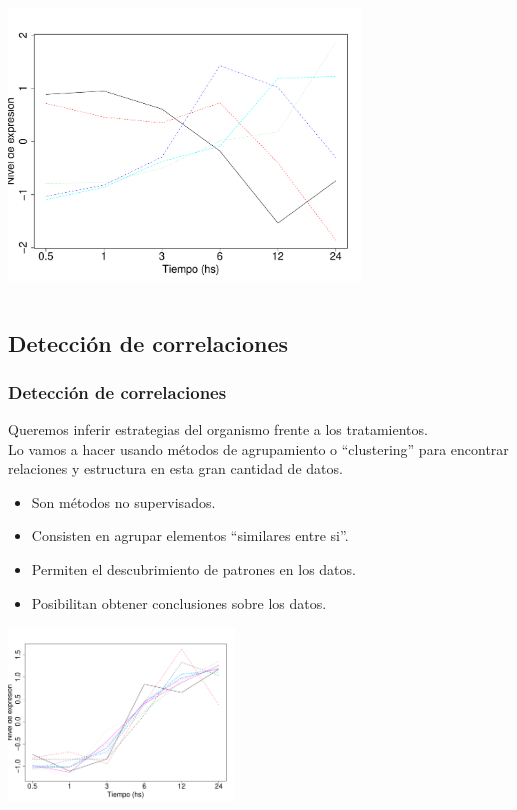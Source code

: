 \documentclass[serif,9pt, t]{beamer}
\begin{document}
\begin{frame}
\begin{columns}[T]
			\centering	
			\includegraphics[width=0.7\textwidth]{perfiles_sin_agrupar.pdf}			
	\end{columns}
\end{frame}

\subsection{Detección de correlaciones}
\begin{frame}\frametitle{Detección de correlaciones} 
\large
Queremos inferir estrategias del organismo frente a los tratamientos.\\\bigskip
Lo vamos a hacer usando métodos de agrupamiento o ``clustering'' para encontrar relaciones y estructura en esta gran cantidad de datos.\medskip
\normalsize
\begin{itemize}
\item Son métodos no supervisados.
\item Consisten en agrupar elementos ``similares entre si''.
\item Permiten el descubrimiento de patrones en los datos.
\item Posibilitan obtener conclusiones sobre los datos.
\end{itemize}
\medskip
\centering
\includegraphics[width=0.45\textwidth]{perfiles_coregulados.pdf}
\end{frame}
\end{document}
